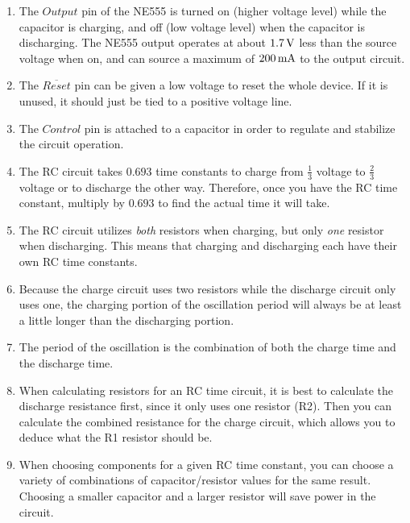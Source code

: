 \begin{enumerate}
\item The $Output$ pin of the NE555 is turned on (higher voltage level) while the capacitor is charging, and off (low voltage level) when the capacitor is discharging.  The NE555 output operates at about $1.7\,\si{\volt}$ less than the source voltage when on, and can source a maximum of $200\,\si{\milli\ampere}$ to the output circuit.
\item The $\overline{Reset}$ pin can be given a low voltage to reset the whole device.  If it is unused, it should just be tied to a positive voltage line.
\item The $Control$ pin is attached to a capacitor in order to regulate and stabilize the circuit operation.
\item The RC circuit takes $0.693$ time constants to charge from $\frac{1}{3}$ voltage to $\frac{2}{3}$ voltage or to discharge the other way.  Therefore, once you have the RC time constant, multiply by $0.693$ to find the actual time it will take.
\item The RC circuit utilizes \emph{both} resistors when charging, but only \emph{one} resistor when discharging.  This means that charging and discharging each have their own RC time constants.
\item Because the charge circuit uses two resistors while the discharge circuit only uses one, the charging portion of the oscillation period will always be at least a little longer than the discharging portion.
\item The period of the oscillation is the combination of both the charge time and the discharge time.
\item When calculating resistors for an RC time circuit, it is best to calculate the discharge resistance first, since it only uses one resistor (R2).  Then you can calculate the combined resistance for the charge circuit, which allows you to deduce what the R1 resistor should be.
\item When choosing components for a given RC time constant, you can choose a variety of combinations of capacitor/resistor values for the same result.  Choosing a smaller capacitor and a larger resistor will save power in the circuit.
\end{enumerate}

\applysection

